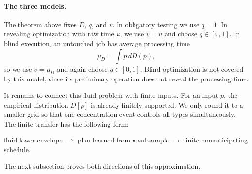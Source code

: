 \begin{center}
\end{center}

\paragraph{The three models.}
The theorem above fixes $D$, $q$, and $v$.  In obligatory testing we use
$q=1$.  In revealing optimization with raw time $u$, we use $v=u$ and choose
$q\in[0,1]$.  In blind execution, an untouched job has average processing
time
\[
 \mu_D=\int p\,dD(p),
\]
so we use $v=\mu_D$ and again choose $q\in[0,1]$.  Blind optimization is not
covered by this model, since its preliminary operation does not reveal the
processing time.

It remains to connect this fluid problem with finite inputs.  For an
input $p$, the empirical distribution $D[p]$ is already finitely
supported.  We only round it to a smaller grid so that one concentration
event controls all types simultaneously.  The finite transfer has the
following form:
\begin{center}
\small
fluid lower envelope $\longrightarrow$ plan learned from a subsample
$\longrightarrow$ finite nonanticipating schedule.
\end{center}
The next subsection proves both directions of this approximation.
